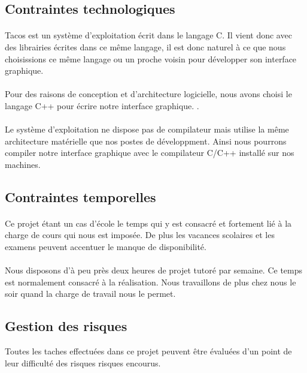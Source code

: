 
\subsection{Contraintes technologiques}
\paragraph{}
Tacos est un système d'exploitation écrit dans le langage C. Il vient donc avec des librairies écrites dans ce même langage, il est donc naturel à ce que nous choisissions ce même langage ou un proche voisin pour développer son interface graphique.
\paragraph{}
Pour des raisons de conception et d'architecture logicielle, nous avons choisi le langage C++ pour écrire notre interface graphique. . 
\paragraph{}
Le système d'exploitation ne dispose pas de compilateur mais utilise la même architecture matérielle que nos postes de développment. Ainsi nous pourrons compiler notre interface graphique avec le compilateur C/C++ installé sur nos machines.
\subsection{Contraintes temporelles}
\paragraph{}
Ce projet étant un cas d'école le temps qui y est consacré et fortement lié à la charge de cours qui nous est imposée. 
De plus les vacances scolaires et les examens peuvent accentuer le manque de disponibilité.
\paragraph{}
Nous disposons d'à peu près deux heures de projet tutoré par semaine. Ce temps est normalement consacré à la réalisation. Nous travaillons de plus chez nous le soir quand la charge de travail nous le permet.
\subsection{Gestion des risques}
Toutes les taches effectuées dans ce projet peuvent être évaluées d'un point de leur difficulté des risques risques encourus.
